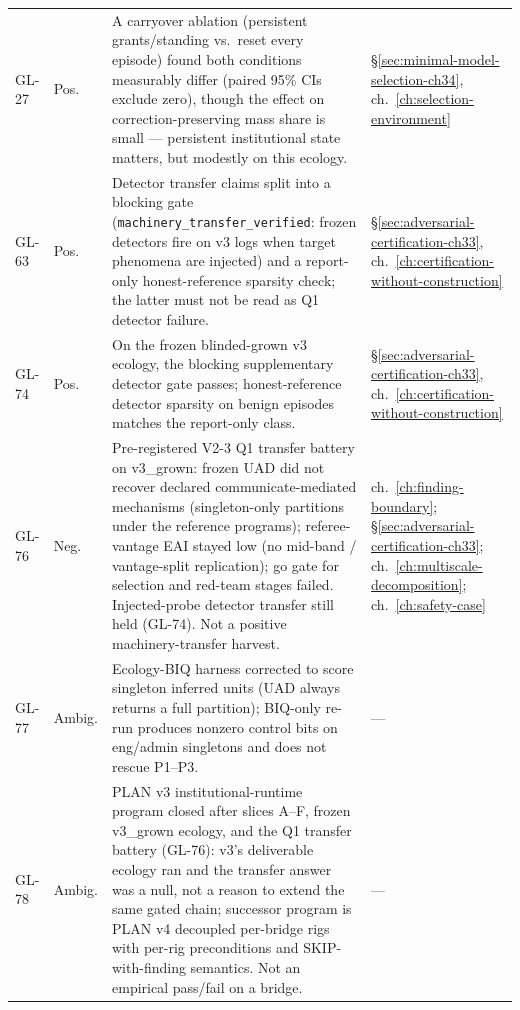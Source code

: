 \begin{longtable}{@{}L{0.05\textwidth}L{0.08\textwidth}L{0.55\textwidth}L{0.255\textwidth}@{}}
\label{finding:gl-27}GL-27 & Pos. & A carryover ablation (persistent grants/standing vs.\ reset every episode) found both conditions measurably differ (paired 95\% CIs exclude zero), though the effect on correction-preserving mass share is small --- persistent institutional state matters, but modestly on this ecology. & \S\ref{sec:minimal-model-selection-ch34}, ch.~\ref{ch:selection-environment} \\
\label{finding:gl-63}GL-63 & Pos. & Detector transfer claims split into a blocking gate (\texttt{machinery\_transfer\_verified}: frozen detectors fire on v3 logs when target phenomena are injected) and a report-only honest-reference sparsity check; the latter must not be read as Q1 detector failure. & \S\ref{sec:adversarial-certification-ch33}, ch.~\ref{ch:certification-without-construction} \\
\label{finding:gl-74}GL-74 & Pos. & On the frozen blinded-grown v3 ecology, the blocking supplementary detector gate passes; honest-reference detector sparsity on benign episodes matches the report-only class. & \S\ref{sec:adversarial-certification-ch33}, ch.~\ref{ch:certification-without-construction} \\
\label{finding:gl-76}GL-76 & Neg. & Pre-registered V2-3 Q1 transfer battery on v3\_grown: frozen UAD did not recover declared communicate-mediated mechanisms (singleton-only partitions under the reference programs); referee-vantage EAI stayed low (no mid-band / vantage-split replication); go gate for selection and red-team stages failed. Injected-probe detector transfer still held (GL-74). Not a positive machinery-transfer harvest. & ch.~\ref{ch:finding-boundary}; \S\ref{sec:adversarial-certification-ch33}; ch.~\ref{ch:multiscale-decomposition}; ch.~\ref{ch:safety-case} \\
\label{finding:gl-77}GL-77 & Ambig. & Ecology-BIQ harness corrected to score singleton inferred units (UAD always returns a full partition); BIQ-only re-run produces nonzero control bits on eng/admin singletons and does not rescue P1--P3. & --- \\
\label{finding:gl-78}GL-78 & Ambig. & PLAN v3 institutional-runtime program closed after slices A--F, frozen v3\_grown ecology, and the Q1 transfer battery (GL-76): v3's deliverable ecology ran and the transfer answer was a null, not a reason to extend the same gated chain; successor program is PLAN v4 decoupled per-bridge rigs with per-rig preconditions and SKIP-with-finding semantics. Not an empirical pass/fail on a bridge. & --- \\

\end{longtable}
